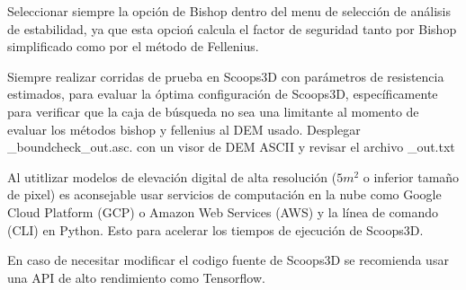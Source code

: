 Seleccionar siempre la opci\'on de Bishop dentro del menu de selecci\'on de an\'alisis de estabilidad, ya que esta opcio\'n calcula el factor de seguridad tanto por Bishop simplificado como por el m\'etodo de Fellenius.

Siempre realizar corridas de prueba en Scoops3D con par\'ametros de resistencia estimados, para evaluar la \'optima configuraci\'on de Scoops3D, espec\'ificamente para verificar que la caja de b\'usqueda no sea una limitante al momento de evaluar los m\'etodos bishop y fellenius al DEM usado. Desplegar \_boundcheck\_out.asc. con un visor de DEM ASCII y revisar el archivo \_out.txt



Al utitlizar modelos de elevaci\'on digital de alta resoluci\'on ($5m^{2}$ o inferior tama\~no de pixel) es aconsejable usar servicios de computaci\'on en la nube como Google Cloud Platform (GCP) o Amazon Web Services (AWS) y la l\'inea de comando (CLI) en Python. Esto para acelerar los tiempos de ejecuci\'on de Scoops3D.

En caso de necesitar modificar el codigo fuente de Scoops3D se recomienda usar una API de alto rendimiento como Tensorflow.

